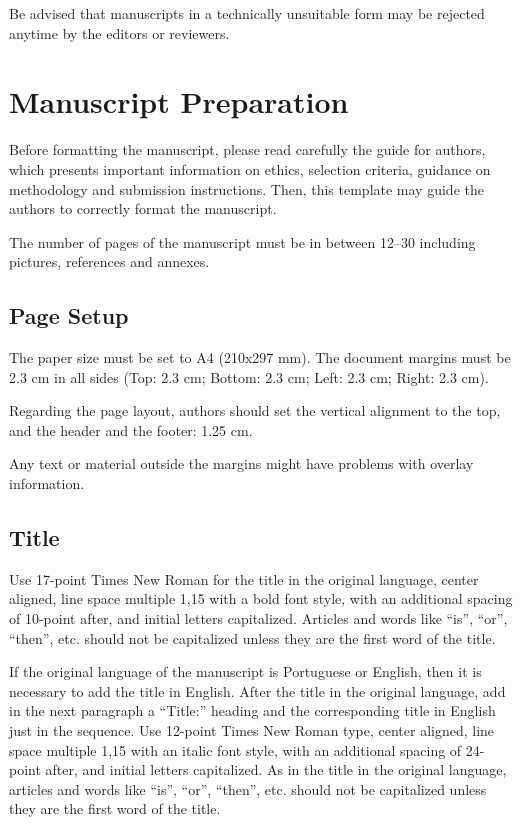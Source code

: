 \documentclass[english,brazilian]{RBIEarticle} %
\begin{document}
Be advised that manuscripts in a technically unsuitable form may be rejected anytime by the editors or reviewers.


\section{Manuscript Preparation}
Before formatting the manuscript, please read carefully the guide for authors, which presents important information on ethics, selection criteria, guidance on methodology and submission instructions. Then, this template may guide the authors to correctly format the manuscript.

The number of pages of the manuscript must be in between 12--30 including pictures, references and annexes.


\subsection{Page Setup}
The paper size must be set to A4 (210x297 mm). The document margins must be 2.3 cm in all sides (Top: 2.3 cm; Bottom: 2.3 cm; Left: 2.3 cm; Right: 2.3 cm).

Regarding the page layout, authors should set the vertical alignment to the top, and the header and the footer: 1.25 cm.

Any text or material outside the margins might have problems with overlay information.


\subsection{Title}
Use 17-point Times New Roman for the title in the original language, center aligned, line space multiple 1,15 with a bold font style, with an additional spacing of 10-point after, and initial letters capitalized. Articles and words like ``is'', ``or'', ``then'', etc. should not be capitalized unless they are the first word of the title.

If the original language of the manuscript is Portuguese or English, then it is necessary to add the title in English. After the title in the original language, add in the next paragraph a “Title:” heading and the corresponding title in English just in the sequence. Use 12-point Times New Roman type, center aligned, line space multiple 1,15 with an italic font style, with an additional spacing of 24-point after, and initial letters capitalized. As in the title in the original language, articles and words like ``is'', ``or'', ``then'', etc. should not be capitalized unless they are the first word of the title.
\end{document}
